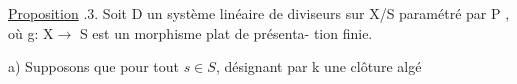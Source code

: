 \uline{Proposition} .3. Soit D un système linéaire de diviseurs sur X/S
paramétré par \hand{$\check{\ }$}P , où g: X$\longrightarrow$ S est  un morphisme plat  de présenta-%
tion finie.

a) Supposons  que pour tout $s \in S$, désignant par k une clôture algé

